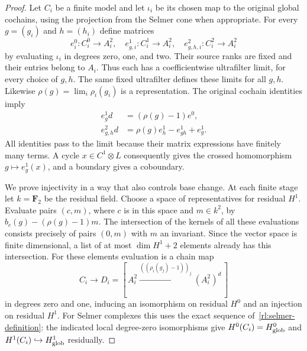 \begin{proof}
Let $C_i$ be a finite model and let $\iota_i$ be its chosen map to the
original global cochains, using the projection from the Selmer cone
when appropriate.  For every $g=(g_i)$ and $h=(h_i)$ define matrices
\[
 e^0_i:C_i^0\to A_i^2,\quad
 e^1_{g,i}:C_i^1\to A_i^2,\quad
 e^2_{g,h,i}:C_i^2\to A_i^2
\]
by evaluating $\iota_i$ in degrees zero, one, and two.  Their source
ranks are fixed and their entries belong to $A_i$.  Thus each has a
coefficientwise ultrafilter limit, for every choice of $g,h$.
The same fixed ultrafilter defines these limits for all $g,h$.  Likewise
$\rho(g)=\lim_i\rho_i(g_i)$ is a representation.  The original
cochain identities imply
\begin{align}
 e^1_g d&=(\rho(g)-1)e^0,\label{rl:eval-boundary}\\
 e^2_{g,h}d&=\rho(g)e^1_h-e^1_{gh}+e^1_g.
                         \label{rl:eval-cocycle}
\end{align}
All identities pass to the limit because their matrix expressions
have finitely many terms.  A cycle $x\in C^1\otimes L$ consequently
gives the crossed homomorphism $g\mapsto e^1_g(x)$, and a boundary
gives a coboundary.

We prove injectivity in a way that also controls base change.  At each
finite stage let $k=\mathbf F_2$ be the residual field.  Choose a
space of representatives for residual $H^1$.  Evaluate pairs $(c,m)$,
where $c$ is in this space and $m\in k^2$, by
$b_c(g)-(\rho(g)-1)m$.  The intersection of the kernels of all
these evaluations consists precisely of pairs $(0,m)$ with $m$ an
invariant.  Since the vector space is finite dimensional, a list of
at most $\dim H^1+2$ elements already has this intersection.  For
these elements evaluation is a chain map
\[
 C_i\longrightarrow D_i=
 [\,A_i^2\xrightarrow{((\rho_i(g_j)-1))_j}(A_i^2)^d\,]
\]
in degrees zero and one, inducing an isomorphism on residual $H^0$
and an injection on residual $H^1$.  For Selmer complexes this uses
the exact sequence of~\eqref{rl:selmer-definition}: the indicated
local degree-zero isomorphisms give $H^0(C_i)=H^0_{\rm glob}$ and
$H^1(C_i)\hookrightarrow H^1_{\rm glob}$ residually.


\end{proof}
